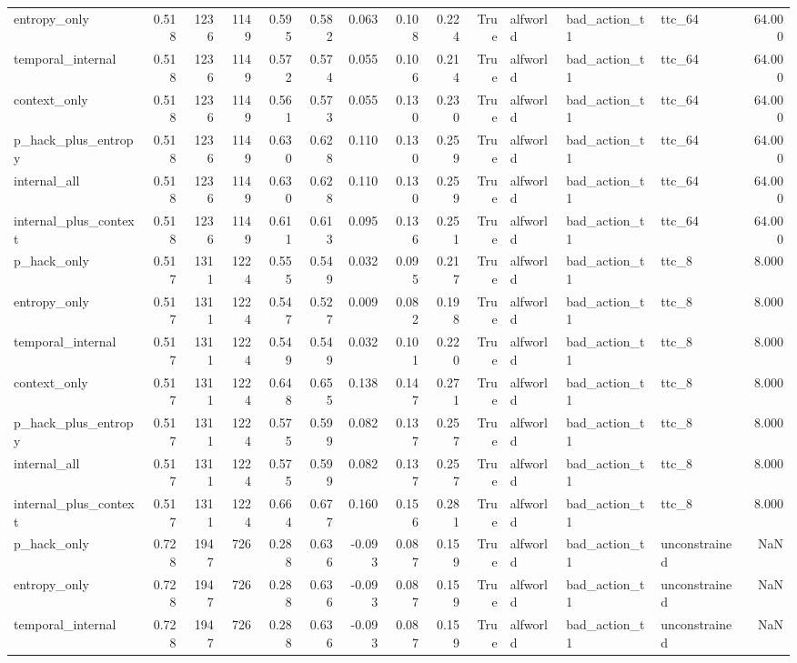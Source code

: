 \begin{tabular}{lrrrrrrrrrlllr}
entropy_only & 0.518 & 1236 & 1149 & 0.595 & 0.582 & 0.063 & 0.108 & 0.224 & True & alfworld & bad_action_t1 & ttc_64 & 64.000 \\
temporal_internal & 0.518 & 1236 & 1149 & 0.572 & 0.574 & 0.055 & 0.106 & 0.214 & True & alfworld & bad_action_t1 & ttc_64 & 64.000 \\
context_only & 0.518 & 1236 & 1149 & 0.561 & 0.573 & 0.055 & 0.130 & 0.230 & True & alfworld & bad_action_t1 & ttc_64 & 64.000 \\
p_hack_plus_entropy & 0.518 & 1236 & 1149 & 0.630 & 0.628 & 0.110 & 0.130 & 0.259 & True & alfworld & bad_action_t1 & ttc_64 & 64.000 \\
internal_all & 0.518 & 1236 & 1149 & 0.630 & 0.628 & 0.110 & 0.130 & 0.259 & True & alfworld & bad_action_t1 & ttc_64 & 64.000 \\
internal_plus_context & 0.518 & 1236 & 1149 & 0.611 & 0.613 & 0.095 & 0.136 & 0.251 & True & alfworld & bad_action_t1 & ttc_64 & 64.000 \\
p_hack_only & 0.517 & 1311 & 1224 & 0.555 & 0.549 & 0.032 & 0.095 & 0.217 & True & alfworld & bad_action_t1 & ttc_8 & 8.000 \\
entropy_only & 0.517 & 1311 & 1224 & 0.547 & 0.527 & 0.009 & 0.082 & 0.198 & True & alfworld & bad_action_t1 & ttc_8 & 8.000 \\
temporal_internal & 0.517 & 1311 & 1224 & 0.549 & 0.549 & 0.032 & 0.101 & 0.220 & True & alfworld & bad_action_t1 & ttc_8 & 8.000 \\
context_only & 0.517 & 1311 & 1224 & 0.648 & 0.655 & 0.138 & 0.147 & 0.271 & True & alfworld & bad_action_t1 & ttc_8 & 8.000 \\
p_hack_plus_entropy & 0.517 & 1311 & 1224 & 0.575 & 0.599 & 0.082 & 0.137 & 0.257 & True & alfworld & bad_action_t1 & ttc_8 & 8.000 \\
internal_all & 0.517 & 1311 & 1224 & 0.575 & 0.599 & 0.082 & 0.137 & 0.257 & True & alfworld & bad_action_t1 & ttc_8 & 8.000 \\
internal_plus_context & 0.517 & 1311 & 1224 & 0.664 & 0.677 & 0.160 & 0.156 & 0.281 & True & alfworld & bad_action_t1 & ttc_8 & 8.000 \\
p_hack_only & 0.728 & 1947 & 726 & 0.288 & 0.636 & -0.093 & 0.087 & 0.159 & True & alfworld & bad_action_t1 & unconstrained & NaN \\
entropy_only & 0.728 & 1947 & 726 & 0.288 & 0.636 & -0.093 & 0.087 & 0.159 & True & alfworld & bad_action_t1 & unconstrained & NaN \\
temporal_internal & 0.728 & 1947 & 726 & 0.288 & 0.636 & -0.093 & 0.087 & 0.159 & True & alfworld & bad_action_t1 & unconstrained & NaN \\

\end{tabular}
